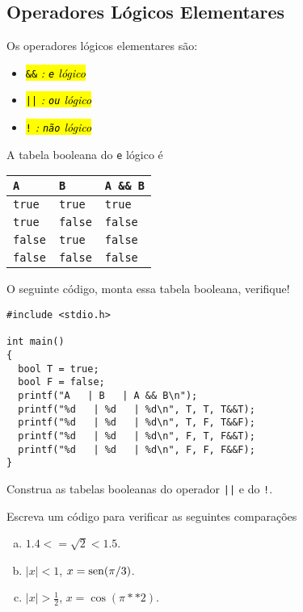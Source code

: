 \documentclass[12pt]{article}
\begin{document}
\subsection{Operadores Lógicos Elementares}

Os operadores lógicos elementares são:
\begin{itemize}
\item[]\hl{{\lstinline+&&+} \emph{: {\lstinline+e+} lógico}}
\item[]\hl{{\lstinline+||+} \emph{: {\lstinline+ou+} lógico}}
\item[]\hl{{\lstinline+!+} \emph{: {\lstinline+não+} lógico}}
\end{itemize}

\begin{ex}
  A tabela booleana{\boole} do \lstinline!e! lógico é
  \begin{center}
    \begin{tabular}[H]{ll|l}
      {\lstinline+A+} & {\lstinline+B+} &  {\lstinline+A && B+}\\\hline
      {\lstinline+true+} & {\lstinline+true+} & {\lstinline+true+} \\
      {\lstinline+true+} & {\lstinline+false+} & {\lstinline+false+} \\
      {\lstinline+false+} & {\lstinline+true+} & {\lstinline+false+} \\
      {\lstinline+false+} & {\lstinline+false+} & {\lstinline+false+} \\\hline
    \end{tabular}
  \end{center}

  O seguinte código, monta essa tabela booleana, verifique!
\begin{lstlisting}
#include <stdio.h>

int main()
{
  bool T = true;
  bool F = false;
  printf("A   | B   | A && B\n");
  printf("%d   | %d   | %d\n", T, T, T&&T);
  printf("%d   | %d   | %d\n", T, F, T&&F);
  printf("%d   | %d   | %d\n", F, T, F&&T);
  printf("%d   | %d   | %d\n", F, F, F&&F);
}
\end{lstlisting}
\end{ex}

\begin{exr}
  Construa as tabelas booleanas do operador \lstinline+||+ e do \lstinline+!+.
\end{exr}

\begin{exr}
  Escreva um código para verificar as seguintes comparações
  \begin{enumerate}[a)]
  \item $1.4 <= \sqrt{2} < 1.5$.
  \item $|x| < 1$, $x = \operatorname{sen}(\pi/3)$.
  \item $|x| > \frac{1}{2}$, $x = \cos(\pi**2)$.
  \end{enumerate}
\end{exr}
\end{document}
